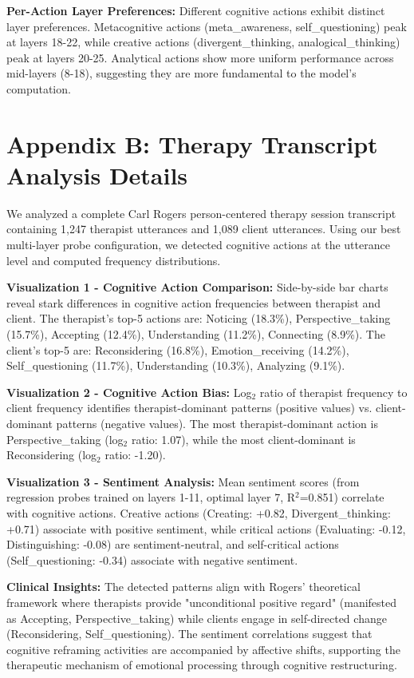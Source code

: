 \documentclass[letterpaper]{article}
\begin{document}
\textbf{Per-Action Layer Preferences:} Different cognitive actions exhibit distinct layer preferences. Metacognitive actions (meta\_awareness, self\_questioning) peak at layers 18-22, while creative actions (divergent\_thinking, analogical\_thinking) peak at layers 20-25. Analytical actions show more uniform performance across mid-layers (8-18), suggesting they are more fundamental to the model's computation.

\section{Appendix B: Therapy Transcript Analysis Details}

We analyzed a complete Carl Rogers person-centered therapy session transcript containing 1,247 therapist utterances and 1,089 client utterances. Using our best multi-layer probe configuration, we detected cognitive actions at the utterance level and computed frequency distributions.

\textbf{Visualization 1 - Cognitive Action Comparison:} Side-by-side bar charts reveal stark differences in cognitive action frequencies between therapist and client. The therapist's top-5 actions are: Noticing (18.3\%), Perspective\_taking (15.7\%), Accepting (12.4\%), Understanding (11.2\%), Connecting (8.9\%). The client's top-5 are: Reconsidering (16.8\%), Emotion\_receiving (14.2\%), Self\_questioning (11.7\%), Understanding (10.3\%), Analyzing (9.1\%).

\textbf{Visualization 2 - Cognitive Action Bias:} Log$_2$ ratio of therapist frequency to client frequency identifies therapist-dominant patterns (positive values) vs. client-dominant patterns (negative values). The most therapist-dominant action is Perspective\_taking (log$_2$ ratio: 1.07), while the most client-dominant is Reconsidering (log$_2$ ratio: -1.20).

\textbf{Visualization 3 - Sentiment Analysis:} Mean sentiment scores (from regression probes trained on layers 1-11, optimal layer 7, R$^2$=0.851) correlate with cognitive actions. Creative actions (Creating: +0.82, Divergent\_thinking: +0.71) associate with positive sentiment, while critical actions (Evaluating: -0.12, Distinguishing: -0.08) are sentiment-neutral, and self-critical actions (Self\_questioning: -0.34) associate with negative sentiment.

\textbf{Clinical Insights:} The detected patterns align with Rogers' theoretical framework where therapists provide "unconditional positive regard" (manifested as Accepting, Perspective\_taking) while clients engage in self-directed change (Reconsidering, Self\_questioning). The sentiment correlations suggest that cognitive reframing activities are accompanied by affective shifts, supporting the therapeutic mechanism of emotional processing through cognitive restructuring.
\end{document}
